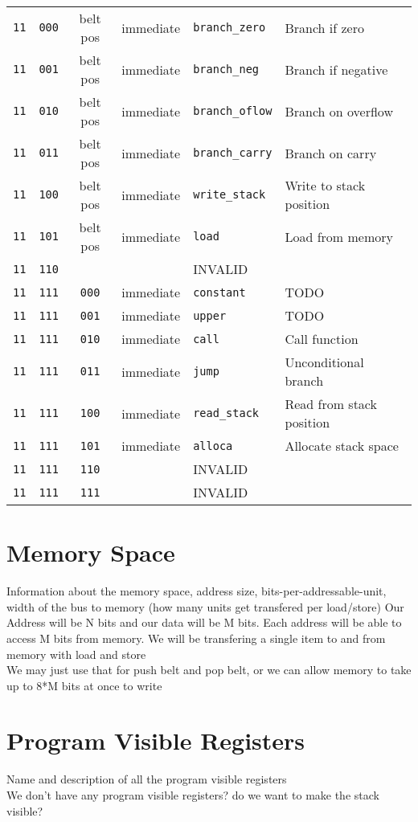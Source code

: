 \documentclass{article}
\begin{document}
\begin{longtable}{c c c c l l}
		\texttt{11} & \texttt{000} & belt pos & immediate & \texttt{branch\_zero} & Branch if zero \\
		\texttt{11} & \texttt{001} & belt pos & immediate & \texttt{branch\_neg} & Branch if negative \\
		\texttt{11} & \texttt{010} & belt pos & immediate & \texttt{branch\_oflow} & Branch on overflow \\
		\texttt{11} & \texttt{011} & belt pos & immediate & \texttt{branch\_carry} & Branch on carry \\
		\texttt{11} & \texttt{100} & belt pos & immediate & \texttt{write\_stack} & Write to stack position \\
		\texttt{11} & \texttt{101} & belt pos & immediate & \texttt{load} & Load from memory \\
		\texttt{11} & \texttt{110} &  &  & INVALID & \\
		\texttt{11} & \texttt{111} & \texttt{000} & immediate & \texttt{constant} & TODO \\
		\texttt{11} & \texttt{111} & \texttt{001} & immediate & \texttt{upper} & TODO \\
		\texttt{11} & \texttt{111} & \texttt{010} & immediate & \texttt{call} & Call function \\
		\texttt{11} & \texttt{111} & \texttt{011} & immediate & \texttt{jump} & Unconditional branch \\
		\texttt{11} & \texttt{111} & \texttt{100} & immediate & \texttt{read\_stack} & Read from stack position \\
		\texttt{11} & \texttt{111} & \texttt{101} & immediate & \texttt{alloca} & Allocate stack space \\
		\texttt{11} & \texttt{111} & \texttt{110} & & INVALID & \\
		\texttt{11} & \texttt{111} & \texttt{111} & & INVALID & \\
	\end{longtable}

\section{Memory Space}
	Information about the memory space, address size, bits-per-addressable-unit, width of the bus to memory (how many units get transfered per load/store)
	Our Address will be N bits and our data will be M bits.
	Each address will be able to access M bits from memory.
	We will be transfering a single item to and from memory with load and store\\
	We may just use that for push belt and pop belt, or we can allow memory to take up to 8*M bits at once to write

\section{Program Visible Registers}
	Name and description of all the program visible registers\\
	We don't have any program visible registers? do we want to make the stack visible? 
\end{document}

